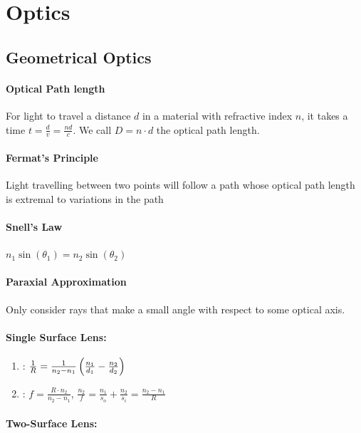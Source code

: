 \section{Optics}

\subsection{Geometrical Optics}

\paragraph{Optical Path length}
For light to travel a distance $d$ in a material with refractive index $n$, it takes
a time $t = \frac{d}{v} = \frac{n d}{c}$. We call $D = n \cdot d$ the optical path length.

\paragraph{Fermat's Principle}
Light travelling between two points will follow a path whose optical path length is
extremal to variations in the path


\paragraph{Snell's Law}

$n_1 \sin(\theta_1) = n_2 \sin(\theta_2)$

\paragraph{Paraxial Approximation}
Only consider rays that make a small angle with respect to some optical
axis.

\paragraph{Single Surface Lens:}

\begin{enumerate}[]
    \item {}:
        $\frac{1}{R} = \frac{1}{n_2 - n_1} \left( \frac{n_1}{d_1} - \frac{n_2}{d_2} \right)$
    \item {}: $f = \frac{R \cdot n_2}{n_2 - n_1}$, $\frac{n_2}{f} = \frac{n_1}{s_o} + \frac{n_2}{s_i} = \frac{n_2 - n_1}{R}$
\end{enumerate}

\paragraph{Two-Surface Lens:}


